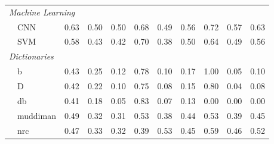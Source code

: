 \begin{table}
\begin{tabularx}{\textwidth}{lXXrrrrrrrrr}
\multicolumn{11}{l}{\emph{ Machine Learning }} \\

 & \multicolumn{2}{l}{ CNN }& \cellcolor[gray]{0.68} 0.63& \cellcolor[gray]{0.75} 0.50& \cellcolor[gray]{0.75} 0.50& \cellcolor[gray]{0.66} 0.68& \cellcolor[gray]{0.76} 0.49& \cellcolor[gray]{0.72} 0.56& \cellcolor[gray]{0.64} 0.72& \cellcolor[gray]{0.71} 0.57& \cellcolor[gray]{0.68} 0.63\\

 & \multicolumn{2}{l}{ SVM }& \cellcolor[gray]{0.71} 0.58& \cellcolor[gray]{0.78} 0.43& \cellcolor[gray]{0.79} 0.42& \cellcolor[gray]{0.65} 0.70& \cellcolor[gray]{0.81} 0.38& \cellcolor[gray]{0.75} 0.50& \cellcolor[gray]{0.68} 0.64& \cellcolor[gray]{0.75} 0.49& \cellcolor[gray]{0.72} 0.56\\


\multicolumn{11}{l}{\emph{ Dictionaries }} \\

 & \multicolumn{2}{l}{ b }& \cellcolor[gray]{0.79} 0.43& \cellcolor[gray]{0.87} 0.25& \cellcolor[gray]{0.94} 0.12& \cellcolor[gray]{0.61} 0.78& \cellcolor[gray]{0.95} 0.10& \cellcolor[gray]{0.91} 0.17& \cellcolor[gray]{0.50} 1.00& \cellcolor[gray]{0.97} 0.05& \cellcolor[gray]{0.95} 0.10\\

 & \multicolumn{2}{l}{ D }& \cellcolor[gray]{0.79} 0.42& \cellcolor[gray]{0.89} 0.22& \cellcolor[gray]{0.95} 0.10& \cellcolor[gray]{0.62} 0.75& \cellcolor[gray]{0.96} 0.08& \cellcolor[gray]{0.93} 0.15& \cellcolor[gray]{0.60} 0.80& \cellcolor[gray]{0.98} 0.04& \cellcolor[gray]{0.96} 0.08\\

 & \multicolumn{2}{l}{ db }& \cellcolor[gray]{0.80} 0.41& \cellcolor[gray]{0.91} 0.18& \cellcolor[gray]{0.97} 0.05& \cellcolor[gray]{0.58} 0.83& \cellcolor[gray]{0.97} 0.07& \cellcolor[gray]{0.94} 0.13& \cellcolor[gray]{1.00} 0.00& \cellcolor[gray]{1.00} 0.00& \cellcolor[gray]{1.00} 0.00\\

 & \multicolumn{2}{l}{ muddiman }& \cellcolor[gray]{0.76} 0.49& \cellcolor[gray]{0.84} 0.32& \cellcolor[gray]{0.84} 0.31& \cellcolor[gray]{0.74} 0.53& \cellcolor[gray]{0.81} 0.38& \cellcolor[gray]{0.78} 0.44& \cellcolor[gray]{0.73} 0.53& \cellcolor[gray]{0.80} 0.39& \cellcolor[gray]{0.77} 0.45\\

 & \multicolumn{2}{l}{ nrc }& \cellcolor[gray]{0.76} 0.47& \cellcolor[gray]{0.84} 0.33& \cellcolor[gray]{0.84} 0.32& \cellcolor[gray]{0.80} 0.39& \cellcolor[gray]{0.73} 0.53& \cellcolor[gray]{0.77} 0.45& \cellcolor[gray]{0.71} 0.59& \cellcolor[gray]{0.77} 0.46& \cellcolor[gray]{0.74} 0.52\\


\end{tabularx}
\end{table}
